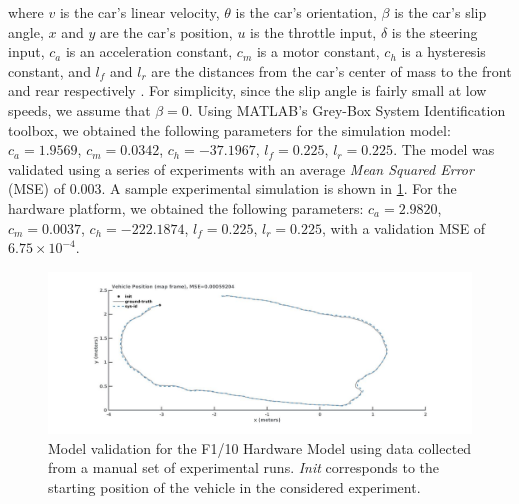 \documentclass[manuscript,screen,review]{acmart}
\begin{document}
\noindent where $v$ is the car's linear velocity, $\theta$ is the car's orientation, $\beta$ is the car's slip angle, $x$ and $y$ are the car's position, $u$ is the throttle input, $\delta$ is the steering input, $c_a$ is an acceleration constant, $c_m$ is a motor constant, $c_h$ is a hysteresis constant, and $l_f$ and $l_r$ are the distances from the car's center of mass to the front and rear respectively \cite{ivanov2020case}. For simplicity, since the slip angle is fairly small at low speeds, we assume that $\beta = 0$.
Using MATLAB's Grey-Box System Identification toolbox, we obtained the following parameters for the simulation model: $c_a = 1.9569$, $c_m = 0.0342$, $c_h = -37.1967$, $l_f =0.225$, $l_r = 0.225$. The model was validated using a series of experiments%
with an average \emph{Mean Squared Error} (MSE) of $0.003$. A sample experimental simulation is shown in \ref{fig:validation}. For the hardware platform, we obtained the following parameters: $c_a = 2.9820$, $c_m = 0.0037$, $c_h = -222.1874$, $l_f =0.225$, $l_r = 0.225$, with a validation MSE of $6.75 \times 10^{-4}$.
\begin{figure}[htbp]
  \centering
    \includegraphics[width=0.8\linewidth]{figures/validation_em.pdf}
   \caption{Model validation for the F1/10 Hardware Model using data collected from a manual set of experimental runs. \emph{Init} corresponds to the starting position of the vehicle in the considered experiment.}
  \label{fig:validation}
\end{figure}
\noindent 
\end{document}
